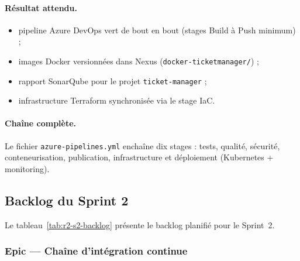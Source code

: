 \paragraph{Résultat attendu.}
\begin{itemize}
  \item pipeline Azure DevOps vert de bout en bout (stages Build à Push minimum) ;
  \item images Docker versionnées dans Nexus (\texttt{docker-ticketmanager/}) ;
  \item rapport SonarQube pour le projet \texttt{ticket-manager} ;
  \item infrastructure Terraform synchronisée via le stage IaC.
\end{itemize}

\paragraph{Chaîne complète.}
Le fichier \texttt{azure-pipelines.yml} enchaîne dix stages : tests, qualité, sécurité,
conteneurisation, publication, infrastructure et déploiement (Kubernetes + monitoring).

\subsection{Backlog du Sprint 2}

Le tableau~\ref{tab:r2-s2-backlog} présente le backlog planifié pour le Sprint~2.

\subsubsection{Epic — Chaîne d'intégration continue}

